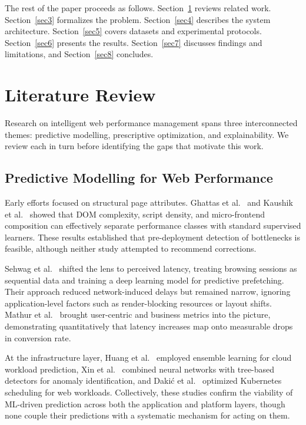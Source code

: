 \documentclass[sn-nature]{sn-jnl}
\begin{document}
The rest of the paper proceeds as follows. Section~\ref{sec2} reviews related work. Section~\ref{sec3} formalizes the problem. Section~\ref{sec4} describes the system architecture. Section~\ref{sec5} covers datasets and experimental protocols. Section~\ref{sec6} presents the results. Section~\ref{sec7} discusses findings and limitations, and Section~\ref{sec8} concludes.


\section{Literature Review}\label{sec2}

Research on intelligent web performance management spans three interconnected themes: predictive modelling, prescriptive optimization, and explainability. We review each in turn before identifying the gaps that motivate this work.

\subsection{Predictive Modelling for Web Performance}

Early efforts focused on structural page attributes. Ghattas et al.~\cite{ghattas2025} and Kaushik et al.~\cite{kaushik2024} showed that DOM complexity, script density, and micro-frontend composition can effectively separate performance classes with standard supervised learners. These results established that pre-deployment detection of bottlenecks is feasible, although neither study attempted to recommend corrections.

Sehwag et al.~\cite{sehwag2024} shifted the lens to perceived latency, treating browsing sessions as sequential data and training a deep learning model for predictive prefetching. Their approach reduced network-induced delays but remained narrow, ignoring application-level factors such as render-blocking resources or layout shifts. Mathur et al.~\cite{mathur2024} brought user-centric and business metrics into the picture, demonstrating quantitatively that latency increases map onto measurable drops in conversion rate.

At the infrastructure layer, Huang et al.~\cite{huang2023} employed ensemble learning for cloud workload prediction, Xin et al.~\cite{xin2023} combined neural networks with tree-based detectors for anomaly identification, and Daki\'{c} et al.~\cite{dakic2025} optimized Kubernetes scheduling for web workloads. Collectively, these studies confirm the viability of ML-driven prediction across both the application and platform layers, though none couple their predictions with a systematic mechanism for acting on them.
\end{document}
